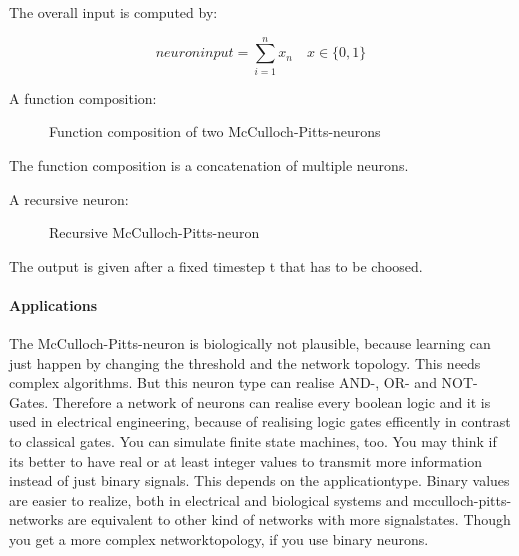 \documentclass[10pt,a4paper,DIV=11]{scrreprt}
\begin{document}
The overall input is computed by:

\begin{equation}
neuroninput = \sum_{i=1}^{n} x_{n} \quad  x \in \{0, 1\}
\end{equation}


A function composition:

\begin{figure}[H]
	\centering
	\caption{Function composition of two McCulloch-Pitts-neurons}
	\label{fig:pitts2}
\end{figure}

The function composition is a concatenation of multiple neurons.

A recursive neuron:

\begin{figure}[H]
	\centering
	\caption{Recursive McCulloch-Pitts-neuron}
	\label{fig:pitts3}
\end{figure}

The output is given after a fixed timestep t that has to be choosed.

\paragraph{Applications}
The McCulloch-Pitts-neuron is biologically not plausible, because learning
can just happen by changing the threshold and the network topology. This
needs complex algorithms.
But this neuron type can realise AND-, OR- and NOT-Gates.
Therefore a network of neurons can realise every boolean logic and it is used in electrical engineering, because of realising logic gates efficently in contrast to classical gates. You can simulate finite state machines, too.
You may think if its better to have real or at least integer values to transmit more information instead of just binary signals. This depends on the applicationtype. Binary values are easier to realize, both in electrical and biological systems and mcculloch-pitts-networks are equivalent to other kind of networks with more signalstates. Though you get a more complex networktopology, if you use binary neurons.
\end{document}
